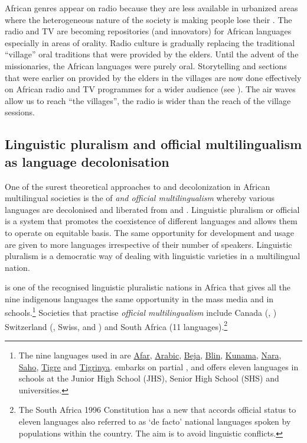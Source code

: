 \documentclass[output=paper,
modfonts
]{langscibook}
\begin{document}
African  genres appear on radio because they are less available in urbanized areas where the heterogeneous nature of the society is making people lose their . The radio and TV are becoming repositories (and innovators) for African languages especially in areas of orality. Radio culture is gradually replacing the traditional “village” oral traditions that were provided by the elders. Until the advent of the missionaries, the African languages were purely oral. Storytelling and  sections that were earlier on provided by the elders in the villages are now done effectively on African radio and TV programmes for a wider audience (see \citealt{Agyekum2000}). The air waves allow us to reach “the villages”, the radio is wider than the reach of the village  sessions.

\subsection{Linguistic pluralism and official multilingualism as language decolonisation}

One of the surest theoretical approaches to  and decolonization in African multilingual societies is the  of \textit{ and official multilingualism} whereby various languages are decolonised and liberated from  and . Linguistic pluralism or official  is a system that promotes the coexistence of different languages and allows them to operate on equitable basis. The same opportunity for development and usage are given to more languages irrespective of their number of speakers. Linguistic pluralism is a democratic way of dealing with linguistic varieties in a multilingual nation. 

 is one of the recognised linguistic pluralistic nations in Africa that gives all the nine indigenous languages the same opportunity in the mass media and in schools.\footnote{The nine languages used in  are 
\href{http://en.wikipedia.org/wiki/Afar_language}{Afar}, \href{http://en.wikipedia.org/wiki/Arabic_language}{Arabic}, 
\href{http://en.wikipedia.org/wiki/Beja_language}{Beja}, 
\href{http://en.wikipedia.org/wiki/Blin_language}{Blin}, 
\href{http://en.wikipedia.org/wiki/Kunama_language}{Kunama}, 
\href{http://en.wikipedia.org/wiki/Nara_language}{Nara}, 
\href{http://en.wikipedia.org/wiki/Saho_language}{Saho}, 
\href{http://en.wikipedia.org/wiki/Tigre_language}{Tigre} and 
\href{http://en.wikipedia.org/wiki/Tigrinya_language}{Tigrinya}. 
 embarks on partial , and offers eleven languages in schools at the Junior High School (JHS), Senior High School (SHS) and universities. } Societies that practise \textit{official multilingualism} include Canada (, ) Switzerland (, Swiss, and ) and South Africa (11 languages).\footnote{The South Africa 1996 Constitution has a new  that accords official status to eleven languages also referred to as ‘de facto’ national languages spoken by  populations within the country. The aim is to avoid linguistic conflicts. 
}
\end{document}
